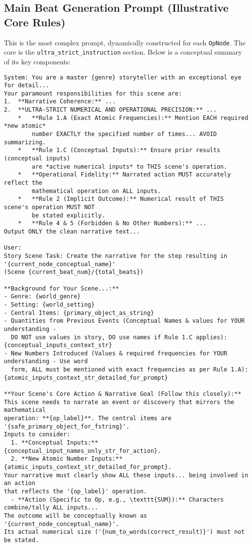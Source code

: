 \documentclass{article}
\begin{document}
\subsection{Main Beat Generation Prompt (Illustrative Core Rules)}
\label{app:prompts_beatgen}
This is the most complex prompt, dynamically constructed for each \texttt{OpNode}. The core is the \texttt{ultra\_strict\_instruction} section. Below is a conceptual summary of its key components:

\begin{verbatim}
System: You are a master {genre} storyteller with an exceptional eye for detail...
Your paramount responsibilities for this scene are:
1.  **Narrative Coherence:** ...
2.  **ULTRA-STRICT NUMERICAL AND OPERATIONAL PRECISION:** ...
    *   **Rule 1.A (Exact Atomic Frequencies):** Mention EACH required *new atomic*
        number EXACTLY the specified number of times... AVOID summarizing.
    *   **Rule 1.C (Conceptual Inputs):** Ensure prior results (conceptual inputs)
        are *active numerical inputs* to THIS scene's operation.
    *   **Operational Fidelity:** Narrated action MUST accurately reflect the
        mathematical operation on ALL inputs.
    *   **Rule 2 (Implicit Outcome):** Numerical result of THIS scene's operation MUST NOT
        be stated explicitly.
    *   **Rule 4 & 5 (Forbidden & No Other Numbers):** ...
Output ONLY the clean narrative text...

User:
Story Scene Task: Create the narrative for the step resulting in '{current_node_conceptual_name}'
(Scene {current_beat_num}/{total_beats})

**Background for Your Scene...:**
- Genre: {world_genre}
- Setting: {world_setting}
- Central Items: {primary_object_as_string}
- Quantities from Previous Events (Conceptual Names & values for YOUR understanding -
  DO NOT use values in story, DO use names if Rule 1.C applies): {conceptual_inputs_context_str}
- New Numbers Introduced (Values & required frequencies for YOUR understanding - Use word
  form, ALL must be mentioned with exact frequencies as per Rule 1.A): {atomic_inputs_context_str_detailed_for_prompt}

**Your Scene's Core Action & Narrative Goal (Follow this closely):**
This scene needs to narrate an event or discovery that mirrors the mathematical
operation: **{op_label}**. The central items are '{safe_primary_object_for_fstring}'.
Inputs to consider:
  1. **Conceptual Inputs:** {conceptual_input_names_only_str_for_action}.
  2. **New Atomic Number Inputs:** {atomic_inputs_context_str_detailed_for_prompt}.
Your narrative must clearly show ALL these inputs... being involved in an action
that reflects the '{op_label}' operation.
  - **Action (Specific to Op, e.g., \texttt{SUM}):** Characters combine/tally ALL inputs...
The outcome will be conceptually known as '{current_node_conceptual_name}'.
Its actual numerical size ('{num_to_words(correct_result)}') must not be stated.


\end{verbatim}
\end{document}
